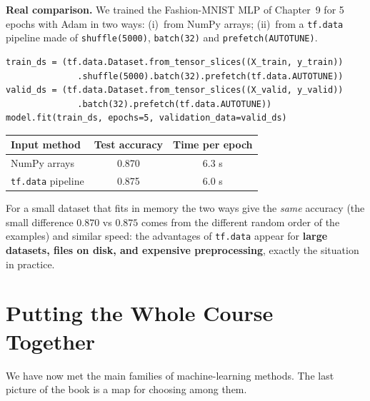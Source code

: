 \textbf{Real comparison.} We trained the Fashion-MNIST MLP of Chapter~9 for 5 epochs with Adam in two ways: (i)~from NumPy arrays; (ii)~from a \texttt{tf.data} pipeline made of \texttt{shuffle(5000)}, \texttt{batch(32)} and \texttt{prefetch(AUTOTUNE)}.

\begin{lstlisting}
train_ds = (tf.data.Dataset.from_tensor_slices((X_train, y_train))
              .shuffle(5000).batch(32).prefetch(tf.data.AUTOTUNE))
valid_ds = (tf.data.Dataset.from_tensor_slices((X_valid, y_valid))
              .batch(32).prefetch(tf.data.AUTOTUNE))
model.fit(train_ds, epochs=5, validation_data=valid_ds)
\end{lstlisting}

\begin{center}
\begin{tabular}{@{}lcc@{}}
\toprule
\textbf{Input method} & \textbf{Test accuracy} & \textbf{Time per epoch}\\
\midrule
NumPy arrays & 0.870 & 6.3 s\\
\texttt{tf.data} pipeline & 0.875 & 6.0 s\\
\bottomrule
\end{tabular}
\end{center}

\noindent For a small dataset that fits in memory the two ways give the \emph{same} accuracy (the small difference $0.870$ vs $0.875$ comes from the different random order of the examples) and similar speed: the advantages of \texttt{tf.data} appear for \textbf{large datasets, files on disk, and expensive preprocessing}, exactly the situation in practice.

\section{Putting the Whole Course Together}

We have now met the main families of machine-learning methods. The last picture of the book is a map for choosing among them.

